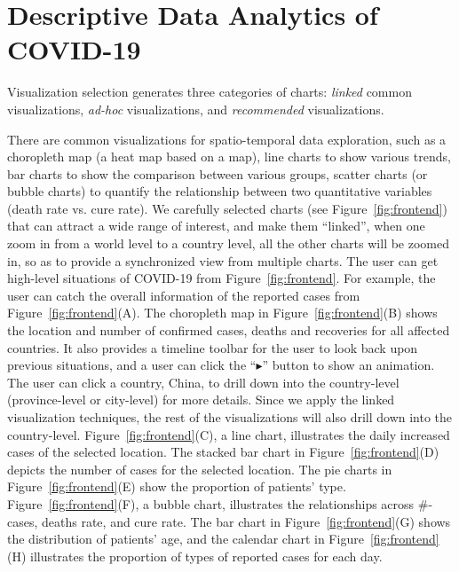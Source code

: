 \section{Descriptive Data Analytics of COVID-19}
\label{sec:descriptive}




Visualization selection generates three categories of charts: {\em linked} common visualizations, {\em ad-hoc} visualizations, and {\em recommended} visualizations.

 There are common visualizations for spatio-temporal data exploration, such as a choropleth map (a heat map based on a map), line charts to show various trends, bar charts to show the comparison between various groups, scatter charts (or bubble charts) to quantify the relationship between two quantitative variables (\eg death rate vs. cure rate).
We carefully selected charts (see Figure~\ref{fig:frontend}) that can attract a wide range of interest, and make them ``linked'', \eg when one zoom in from a world level to a country level, all the other charts will be zoomed in, so as to provide a synchronized view from multiple charts.
The user can get high-level situations of COVID-19 from Figure~\ref{fig:frontend}.
For example, the user can catch the overall information of the reported cases from Figure~\ref{fig:frontend}(A).
%
The choropleth map in Figure~\ref{fig:frontend}(B) shows the location and number of confirmed cases, deaths and recoveries for all affected countries. It also provides a timeline toolbar for the user to look back upon previous situations, and a user can click the ``$\blacktriangleright$'' button to show an animation.
%
The user can click a country, \eg China, to drill down into the country-level (province-level or city-level) for more details. Since we apply the linked visualization techniques, the rest of the visualizations will also drill down into the country-level.
%
Figure~\ref{fig:frontend}(C), a line chart, illustrates the daily increased cases of the selected location.
%
The stacked bar chart in Figure~\ref{fig:frontend}(D) depicts the number of cases for the selected location.
%
The pie charts in Figure~\ref{fig:frontend}(E) show the proportion of patients' type.
% 
Figure~\ref{fig:frontend}(F), a bubble chart, illustrates the relationships across \#-cases, deaths rate, and cure rate.
%
The bar chart in Figure~\ref{fig:frontend}(G) shows the distribution of patients' age, and the calendar chart in Figure~\ref{fig:frontend}(H) illustrates the proportion of types of reported cases for each day.


